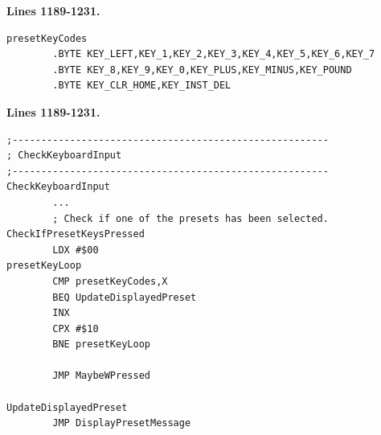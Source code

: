 \clearpage
\textbf{Lines 1189-1231. } 
\begin{lstlisting}
presetKeyCodes
        .BYTE KEY_LEFT,KEY_1,KEY_2,KEY_3,KEY_4,KEY_5,KEY_6,KEY_7
        .BYTE KEY_8,KEY_9,KEY_0,KEY_PLUS,KEY_MINUS,KEY_POUND
        .BYTE KEY_CLR_HOME,KEY_INST_DEL
\end{lstlisting}
\textbf{Lines 1189-1231. } 
\begin{lstlisting}
;-------------------------------------------------------
; CheckKeyboardInput
;-------------------------------------------------------
CheckKeyboardInput   
        ...
        ; Check if one of the presets has been selected.
CheckIfPresetKeysPressed   
        LDX #$00
presetKeyLoop   
        CMP presetKeyCodes,X
        BEQ UpdateDisplayedPreset
        INX 
        CPX #$10
        BNE presetKeyLoop

        JMP MaybeWPressed

UpdateDisplayedPreset   
        JMP DisplayPresetMessage
\end{lstlisting}

\clearpage

